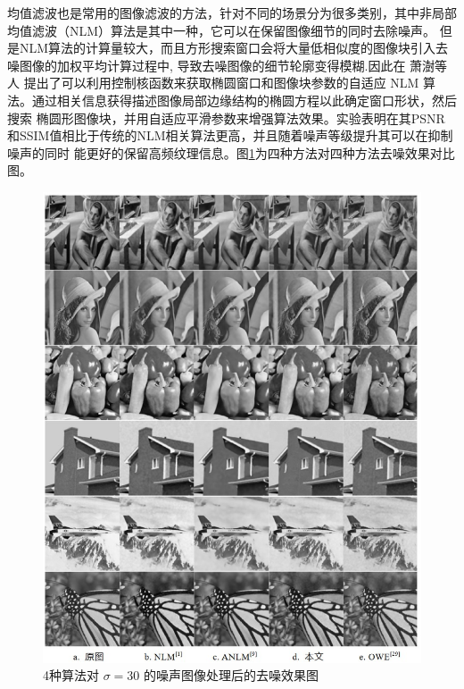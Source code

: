 均值滤波也是常用的图像滤波的方法，针对不同的场景分为很多类别，其中非局部均值滤波（NLM）算法是其中一种，它可以在保留图像细节的同时去除噪声。
但是NLM算法的计算量较大，而且方形搜索窗口会将大量低相似度的图像块引入去噪图像的加权平均计算过程中, 导致去噪图像的细节轮廓变得模糊.因此在
萧澍等人\cite{xiaoTuoyuanchuangkouhecanshuzishiyingdefeijubujunzhisuanfa2020}
提出了可以利用控制核函数来获取椭圆窗口和图像块参数的自适应 NLM 算法。通过相关信息获得描述图像局部边缘结构的椭圆方程以此确定窗口形状，然后搜索
椭圆形图像块，并用自适应平滑参数来增强算法效果。实验表明在其PSNR和SSIM值相比于传统的NLM相关算法更高，并且随着噪声等级提升其可以在抑制噪声的同时
能更好的保留高频纹理信息。图\ref{06}为四种方法对四种方法去噪效果对比图。

\begin{figure}[htbp]
	\begin{center}
		\includegraphics[width = 1\textwidth]{images/06.eps}
		\caption{4种算法对 $\sigma=30$ 的噪声图像处理后的去噪效果图} 
		\label{06} %
	\end{center}
\end{figure}

